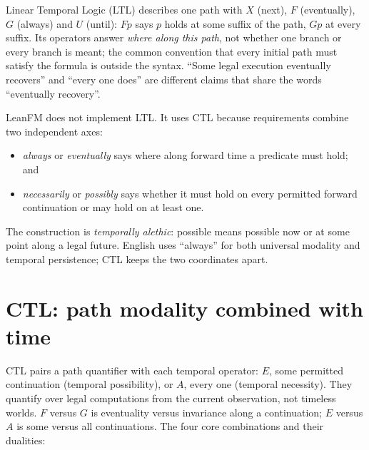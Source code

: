 Linear Temporal Logic (LTL) describes one path with $X$ (next), $F$
(eventually), $G$ (always) and $U$ (until): $F p$ says $p$ holds at some suffix of
the path, $G p$ at every suffix. Its operators answer \emph{where along this
path}, not whether one branch or every branch is meant; the common convention that
every initial path must satisfy the formula is outside the syntax. ``Some legal
execution eventually recovers'' and ``every one does'' are different claims that
share the words ``eventually recovery''.

LeanFM does not implement LTL. It uses CTL because requirements combine two
independent axes:

\begin{itemize}
  \item \emph{always} or \emph{eventually} says where along forward time a
        predicate must hold; and
  \item \emph{necessarily} or \emph{possibly} says whether it must hold on every
        permitted forward continuation or may hold on at least one.
\end{itemize}

The construction is \emph{temporally alethic}: possible means possible now or at
some point along a legal future. English uses ``always'' for both universal
modality and temporal persistence; CTL keeps the two coordinates apart.

\section{CTL: path modality combined with time}

CTL pairs a path quantifier with each temporal operator: $E$, some permitted
continuation (temporal possibility), or $A$, every one (temporal necessity). They
quantify over legal computations from the current observation, not timeless
worlds. $F$ versus $G$ is eventuality versus invariance along a continuation; $E$
versus $A$ is some versus all continuations. The four core combinations and their
dualities:


